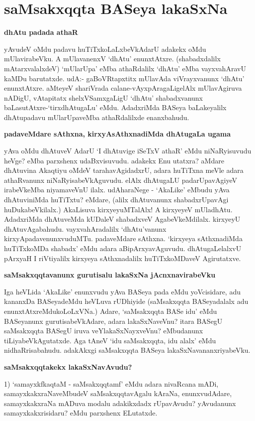 \chapter{saMsakxqqta BASeya lakaSxNa}

\noindent
\textbf{dhAtu padada athaR}\label{page1}

yAvudeV oMdu padavu huTiTxkoLaLxbeVkAdarU adakekx oMdu mUlavirabeVku. A mUlavanenxV `dhAtu' enunxtAtxre. (shabadxdalilx mAtarxvalalxdeV) `mUlarUpa' eMba athaRdalilx `dhAtu' eMba vayxvahAravU kaMDu barutatxde. udA:- gaBoVRtapxtitx mUlavAda viVrayxvanunx `dhAtu' enunxtAtxre. aMteyeV shariVrada calane-vAyxpAragaLigelAlx mUlavAgiruva nADigU, vAtapitatx shelxVSamxgaLigU `dhAtu' shabadxvanunx baLasutAtxre-`tirxdhAtugaLu' eMdu. AdadxriMda BASeya baLakeyalilx dhAtupadavu mUlarUpaveMba athaRdalilxde enanxbahudu.

\noindent
\textbf{padaveMdare sAthxna, kirxyAsAthxnadiMda dhAtugaLa ugama}\label{page1}

yAva oMdu dhAtuveV AdarU `I dhAtuvige iSeTxV athaR' eMdu niNaRyisuvudu heVge? eMba parxshenx udaBxvisuvudu. adakekx Enu utatxra? aMdare dhAtuvina Akaqtiyu oMdeV tarahavAgidadxrU, adara huTiTxna meVle adara athaRvanunx niNaRyisabeVkAguvudu. elAlx dhAtugaLU padarUpavAgiyeV irabeVkeMba niyamaveVnU ilalx. udAharaNege - `AkaLike' eMbudu yAva dhAtuviniMda huTiTxtu? eMdare, (alilx dhAtuvanunx shabadxrUpavAgi huDukabeVkilalx.) AkaLisuva kirxyeyuMTalAlx! A kirxyeyeV mUladhAtu. AdadxriMda dhAtuveMda kUDaleV shabadxveV AgabeVkeMdilalx. kirxyeyU dhAtuvAgabahudu. vayxvahAradalilx `dhAtu'vanunx kirxyApadavenunxvuduMTu. padaveMdare sAthxna. `kirxyeya sAthxnadiMda huTiTxkoMDa shabadx' eMdu adara aBipArxyavAguvudu. dhAtugaLelalxvU pArxyaH I riVtiyalilx kirxyeya sAthxnadalilx huTiTxkoMDaveV Agirutatxve.

\noindent
\textbf{saMsakxqqtavanunx gurutisalu lakaSxNa jAcnxnavirabeVku}\label{page1}

Iga heVLida `AkaLike' enunxvudu yAva BASeya pada eMdu yoVcisidare, adu kananxDa BASeyadeMdu heVLuva rUDhiyide (saMsakxqqta BASeyadalalx adu enunxtAtxreMdukoLoLxVNa.) Adare, `saMsakxqqta BASe idu' eMdu BASeyanunx gurutisabeVkAdare, adara lakaSxNaveVnu? itara BASegU saMsakxqqta BASegU iruva veYlakaSxNayxveVnu? eMbudanunx tiLiyabeVkAgutatxde. Aga tAneV `idu saMsakxqqta, idu alalx' eMdu nidhaRrisabahudu. adakAkxgi saMsakxqqta BASeya lakaSxNavananxriyabeVku.

\noindent
\textbf{saMsakxqqtakekx lakaSxNavAvudu?}\label{page2}

1) `samayxkfkaqtaM - saMsakxqqtamf' eMdu adara nivaRcana mADi, samayxkakxraNaveMbudeV saMsakxqqtavAgalu kAraNa, enunxvudAdare, samayxkakxraNa mADuva modalu adakikxdadx rUpavAvudu? yAvudanunx samayxkakxrisidaru? eMdu parxshenx ELutatxde.

